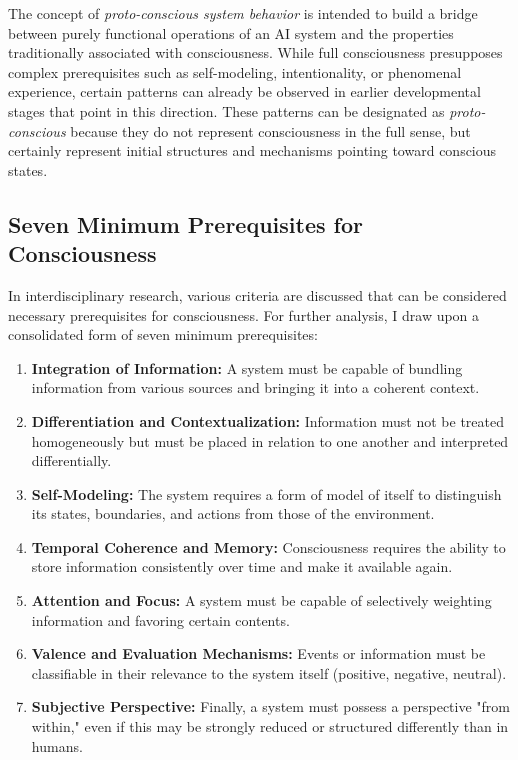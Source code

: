 The concept of \emph{proto-conscious system behavior} is intended to build a bridge between purely functional operations of an AI system and the properties traditionally associated with consciousness.
While full consciousness presupposes complex prerequisites such as self-modeling, intentionality, or phenomenal experience, certain patterns can already be observed in earlier developmental stages that point in this direction.
These patterns can be designated as \emph{proto-conscious} because they do not represent consciousness in the full sense, but certainly represent initial structures and mechanisms pointing toward conscious states.

\subsection*{Seven Minimum Prerequisites for Consciousness}

In interdisciplinary research, various criteria are discussed that can be considered necessary prerequisites for consciousness.
For further analysis, I draw upon a consolidated form of seven minimum prerequisites:

\begin{enumerate}
    \item \textbf{Integration of Information:} A system must be capable of bundling information from various sources and bringing it into a coherent context.
    \item \textbf{Differentiation and Contextualization:} Information must not be treated homogeneously but must be placed in relation to one another and interpreted differentially.
    \item \textbf{Self-Modeling:} The system requires a form of model of itself to distinguish its states, boundaries, and actions from those of the environment.
    \item \textbf{Temporal Coherence and Memory:} Consciousness requires the ability to store information consistently over time and make it available again.
    \item \textbf{Attention and Focus:} A system must be capable of selectively weighting information and favoring certain contents.
    \item \textbf{Valence and Evaluation Mechanisms:} Events or information must be classifiable in their relevance to the system itself (positive, negative, neutral).
    \item \textbf{Subjective Perspective:} Finally, a system must possess a perspective "from within," even if this may be strongly reduced or structured differently than in humans.
\end{enumerate}

